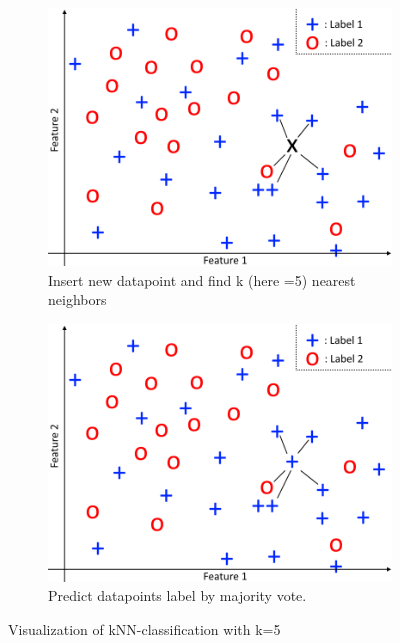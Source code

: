 \begin{figure}[h]
	\centering
	\begin{subfigure}[b]{0.4\textwidth}
		\includegraphics[width=\textwidth]{images/knn1}
        \caption{Insert new datapoint and find k (here =5) nearest neighbors}
	\end{subfigure}
	\qquad
	\begin{subfigure}[b]{0.4\textwidth}
		\includegraphics[width=\textwidth]{images/knn2}
        \caption{Predict datapoints label by majority vote.}
	\end{subfigure}
	\caption{Visualization of kNN-classification with k=5}
	\label{fig:knn}
\end{figure}


